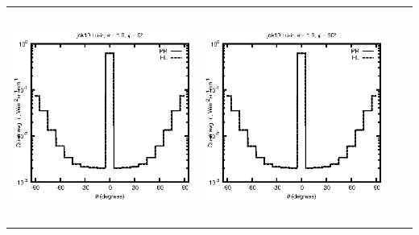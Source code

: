 \begin{tabular}{c c c c}
\includegraphics[height=7cm]{../eps/jok10_Lu_ir_fwd.eps} &
\includegraphics[height=7cm]{../eps/jok10_Lu_ir_cross.eps} \\
\end{tabular}
